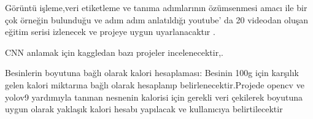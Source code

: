 \documentclass[11pt,a4paper]{report}
\begin{document}
    Görüntü işleme,veri etiketleme ve tanıma adımlarının özümsenmesi amacı ile bir çok örneğin bulunduğu ve adım adım anlatıldığı youtube' da 20 videodan oluşan eğitim serisi izlenecek ve projeye uygun uyarlanacaktır \cite{yoloandopencv}.
    \newline
    
    CNN anlamak için kaggledan bazı projeler incelenecektir\cite{CNNproje},\cite{CNNproje2}.
    \newline
    

    Besinlerin boyutuna bağlı olarak kalori hesaplaması: Besinin 100g için karşılık gelen kalori miktarına bağlı olarak hesaplanıp belirlenecektir\cite{kalorihesabı}.Projede opencv ve yolov9 yardımıyla tanınan nesnenin kalorisi için gerekli veri çekilerek boyutuna uygun olarak yaklaşık kalori hesabı yapılacak ve kullanıcıya belirtilecektir
   
\end{document}
